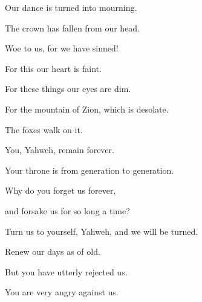 {\par }{\QB Our dance is turned into mourning.
\par }{\Q {}The crown has fallen from our head.
\par }{\QB Woe to us, for we have sinned!
\par }{\Q {}For this our heart is faint.
\par }{\QB For these things our eyes are dim.
\par }{\Q {}For the mountain of Zion, which is desolate.
\par }{\QB The foxes walk on it.
\par }{\BB \par }{\Q {}You, Yahweh, remain forever.
\par }{\QB Your throne is from generation to generation.
\par }{\Q {}Why do you forget us forever,
\par }{\QB and forsake us for so long a time?
\par }{\Q {}Turn us to yourself, Yahweh, and we will be turned.
\par }{\QB Renew our days as of old.
\par }{\Q {}But you have utterly rejected us.
\par }{\QB You are very angry against us.
\par }